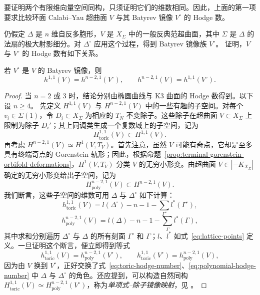 要证明两个有限维向量空间同构，只须证明它们的维数相同。因此，上面的第一项要求比较环面 Calabi--Yau 超曲面 $V$ 与其 Batyrev 镜像 $V^\circ$ 的 Hodge 数。

仍假定 $\Delta$ 是 $n$ 维自反多胞形，$V$ 是 $X_\Sigma$ 中的一般反典范超曲面，其中 $\Sigma$ 是 $\Delta$ 的法扇的极大射影细分。对 $\Delta^\circ$ 应用这个过程，得到 Batyrev 镜像族 $V^\circ$。 证明，$V$ 与 $V^\circ$ 的 Hodge 数有如下关系。
\begin{theorem}\label{thm:batyrev-hodge}
若 $V^\circ$ 是 $V$ 的 Batyrev 镜像，则
\[
h^{1,1}(V)=h^{n-2,1}(V^\circ),\qquad
h^{n-2,1}(V)=h^{1,1}(V^\circ).
\]
\end{theorem}
\begin{proof}
当 $n=2$ 或 $3$ 时，结论分别由椭圆曲线与 K3 曲面的 Hodge 数得到。以下设 $n\geq4$。
先定义 $H^{1,1}(V)$ 与 $H^{n-2,1}(V)$ 中的一些有趣的子空间。对每个 $v_i\in\Sigma(1)$，令 $D_i\subset X_\Sigma$ 为相应的 $T_N$ 不变除子。这些除子在超曲面 $V\subset X_\Sigma$ 上限制为除子 $D_i'$；其上同调类生成一个复数域上的子空间，记为
\begin{equation}\label{eq:toric-hodge-subspace}
H_{\mathrm{toric}}^{1,1}(V)\subset H^{1,1}(V).
\end{equation}
再考虑 $H^{n-2,1}(V)\simeq H^1(V,T_V)$。首先注意，虽然 $V$ 可能有奇点，它却是至多具有终端奇点的 Gorenstein 轨形；因此，根据命题~\ref{prop:terminal-gorenstein-orbifold-deformations}，$H^1(V,T_V)$ 分类 $V$ 的无穷小形变。由超曲面 $V\in|-K_{X_\Sigma}|$ 确定的无穷小形变给出子空间，记为
\begin{equation}\label{eq:polynomial-hodge-subspace}
H_{\mathrm{poly}}^{n-2,1}(V)\subset H^{n-2,1}(V).
\end{equation}
我们断言，这些子空间的维数可用 $\Delta$ 与 $\Delta^\circ$ 如下计算：
\begin{equation}\label{eq:toric-hodge-number}
h_{\mathrm{toric}}^{1,1}(V)
=l(\Delta^\circ)-n-1-\sum_{\Gamma^\circ}l^*(\Gamma^\circ),
\end{equation}
\begin{equation}\label{eq:polynomial-hodge-number}
h_{\mathrm{poly}}^{n-2,1}(V)
=l(\Delta)-n-1-\sum_\Gamma l^*(\Gamma),
\end{equation}
其中求和分别遍历 $\Delta^\circ$ 与 $\Delta$ 的所有刻面 $\Gamma^\circ$ 和 $\Gamma$；$l$、$l^*$ 如式~\eqref{eq:lattice-points} 定义。一旦证明这个断言，便立即得到等式
\[
h_{\mathrm{toric}}^{1,1}(V)=h_{\mathrm{poly}}^{n-2,1}(V^\circ),
\qquad
h_{\mathrm{toric}}^{1,1}(V^\circ)=h_{\mathrm{poly}}^{n-2,1}(V),
\]
因为由 $V$ 换到 $V^\circ$，正好交换了式~\eqref{eq:toric-hodge-number}、\eqref{eq:polynomial-hodge-number} 中 $\Delta$ 与 $\Delta^\circ$ 的角色。还应提到，可以构造自然同构 $H_{\mathrm{toric}}^{1,1}(V)\simeq H_{\mathrm{poly}}^{n-2,1}(V^\circ)$，称为\emph{单项式--除子镜像映射}，见 。


\end{proof}

